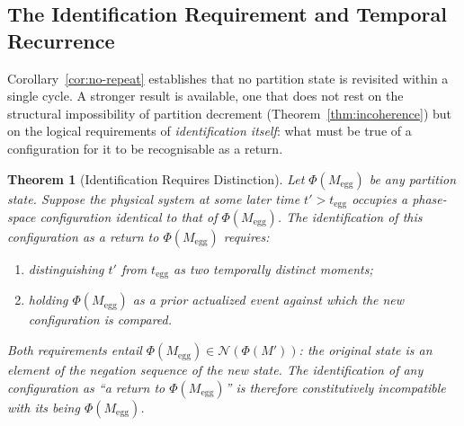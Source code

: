 \documentclass[twocolumn,10pt,a4paper]{article}
\theoremstyle{thmstyle}
\newtheorem{theorem}{Theorem}[section]
\theoremstyle{definition}
\theoremstyle{remark}
\newcommand{\PhiMap}{\varPhi}
\begin{document}
\subsection{The Identification Requirement and Temporal Recurrence}
\label{sec:identification}

Corollary~\ref{cor:no-repeat} establishes that no partition state is revisited within a single cycle. A stronger result is available, one that does not rest on the structural impossibility of partition decrement (Theorem~\ref{thm:incoherence}) but on the logical requirements of \emph{identification itself}: what must be true of a configuration for it to be recognisable as a return.

\begin{theorem}[Identification Requires Distinction]
\label{thm:identification}
Let $\PhiMap(M_{\mathrm{egg}})$ be any partition state. Suppose the physical system at some later time $t' > t_{\mathrm{egg}}$ occupies a phase-space configuration identical to that of $\PhiMap(M_{\mathrm{egg}})$. The identification of this configuration as a \emph{return} to $\PhiMap(M_{\mathrm{egg}})$ requires:
\begin{enumerate}[leftmargin=1.5em,label=(\roman*),itemsep=0.1em]
\item distinguishing $t'$ from $t_{\mathrm{egg}}$ as two temporally distinct moments;
\item holding $\PhiMap(M_{\mathrm{egg}})$ as a prior actualized event against which the new configuration is compared.
\end{enumerate}
Both requirements entail $\PhiMap(M_{\mathrm{egg}}) \in \mathcal{N}(\PhiMap(M'))$: the original state is an element of the negation sequence of the new state. The identification of any configuration as ``a return to $\PhiMap(M_{\mathrm{egg}})$'' is therefore constitutively incompatible with its being $\PhiMap(M_{\mathrm{egg}})$.
\end{theorem}
\end{document}
